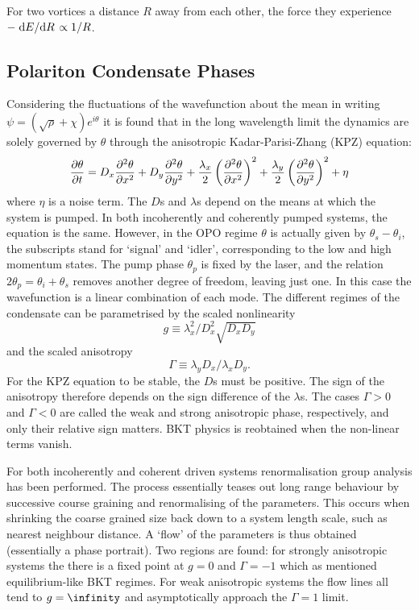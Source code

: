 \documentclass[letterpaper, 10 pt, conference]{IEEEtran}  %
\begin{document}
For two vortices a distance $R$ away from each other, the force they experience $-\dv*{E}{R} \propto 1/R$. 

\subsection{Polariton Condensate Phases}

Considering the fluctuations of the wavefunction about the mean in writing $\psi = (\sqrt{\rho} + \chi)e^{i \theta}$ it is found that in the long wavelength limit the dynamics are solely governed by $\theta$ through the anisotropic Kadar-Parisi-Zhang (KPZ) equation:
\[
\pdv{\theta}{t} = D_x \pdv[2]{\theta}{x} + D_y \pdv[2]{\theta}{y} + \frac{\lambda_x}{2}\left ( \pdv[2]{\theta}{x} \right)^2 + \frac{\lambda_y}{2} \left (\pdv[2]{\theta}{y} \right)^2 + \eta
\]
where $\eta$ is a noise term. 
The $D$s and $\lambda$s depend on the means at which the system is pumped. 
In both incoherently and coherently pumped systems, the equation is the same. 
However, in the OPO regime $\theta$ is actually given by $\theta_s - \theta_i$, the subscripts stand for `signal' and `idler', corresponding to the low and high momentum states.
The pump phase $\theta_p$ is fixed by the laser, and the relation $2 \theta_p = \theta_i + \theta_s$ removes another degree of freedom, leaving just one.  
In this case the wavefunction is a linear combination of each mode.
The different regimes of the condensate can be parametrised by the scaled nonlinearity 
\[
g \equiv \lambda_x^2/D_x^2\sqrt{D_x D_y}
\]
and the scaled anisotropy 
\[
\Gamma \equiv \lambda_y D_x / \lambda_x D_y.
\] 
For the KPZ equation to be stable, the $D$s must be positive.
The sign of the anisotropy therefore depends on the sign difference of the $\lambda$s. 
The cases $\Gamma > 0$ and $\Gamma < 0$ are called the weak and strong anisotropic phase, respectively, and only their relative sign matters.
BKT physics is reobtained when the non-linear terms vanish.

For both incoherently and coherent driven systems renormalisation group analysis has been performed.
The process essentially teases out long range behaviour by successive course graining and renormalising of the parameters. 
This occurs when shrinking the coarse grained size back down to a system length scale, such as nearest neighbour distance.
A `flow' of the parameters is thus obtained (essentially a phase portrait).
Two regions are found: for strongly anisotropic systems the there is a fixed point at $g=0$ and $\Gamma = -1$ which as mentioned equilibrium-like BKT regimes. 
For weak anisotropic systems the flow lines all tend to $g= \infinity$ and asymptotically approach the $\Gamma =1$ limit. 
\end{document}
